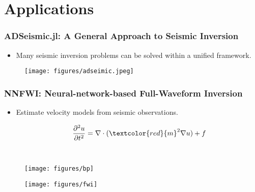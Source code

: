 \documentclass[usenames,dvipsnames]{beamer}
\begin{document}




\section{Applications}



\begin{frame}
	\frametitle{ADSeismic.jl: A General Approach to Seismic Inversion}
	\begin{itemize}
		\item Many seismic inversion problems can be solved within a unified framework. 
	\end{itemize}
	\begin{figure}[hbt]
		\texttt{[image: figures/adseimic.jpeg]}
	\end{figure}
	
\end{frame}


\begin{frame}
	\frametitle{NNFWI: Neural-network-based Full-Waveform Inversion}
	
	\begin{itemize}
		\item Estimate velocity models from seismic observations. 
	\end{itemize}
	\begin{minipage}[t]{0.3\textwidth}
		\begin{equation*}
		\qquad\frac{\partial^2 u}{\partial t^2} = \nabla \cdot (\textcolor{red}{m}^2 \nabla u) + f
		\end{equation*}
	\end{minipage}~
	\begin{minipage}[t]{0.69\textwidth}
		\begin{figure}[hbt]
			\centering
			\texttt{[image: figures/bp]}
		\end{figure}
	\end{minipage}
	
	
	
	\begin{figure}[hbt]
		\texttt{[image: figures/fwi]}
	\end{figure}
\end{frame}
\end{document}
